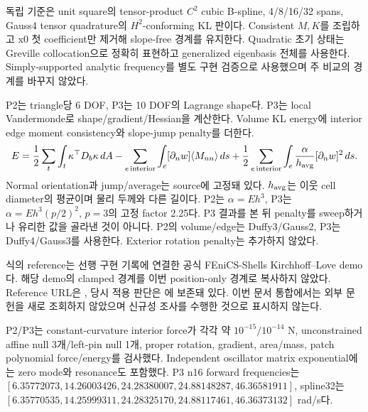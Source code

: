 \documentclass[10pt]{article}
\begin{document}
독립 기준은 unit square의 tensor-product \(C^2\) cubic B-spline, 4/8/16/32 spans,
Gauss4 tensor quadrature의 \(H^2\)-conforming KL 판이다. Consistent \(M,K\)를 조립하고
x0 첫 coefficient만 제거해 slope-free 경계를 유지한다. Quadratic 초기 상태는 Greville collocation으로
정확히 표현하고 generalized eigenbasis 전체를 사용한다.
Simply-supported analytic frequency를 별도 구현 검증으로 사용했으며 주 비교의 경계를 바꾸지 않았다.

P2는 triangle당 6 DOF, P3는 10 DOF의 Lagrange shape다. P3는 local Vandermonde로 shape/gradient/Hessian을
계산한다. Volume KL energy에 interior edge moment consistency와 slope-jump penalty를 더한다.
\begin{equation}
 E=\frac12\sum_t\int_t\kappa^\top D_b\kappa\,dA
 -\sum_{e\,\mathrm{interior}}\int_e[\partial_n w]\langle M_{nn}\rangle\,ds
 +\frac12\sum_{e\,\mathrm{interior}}\int_e\frac{\alpha}{h_{\rm avg}}[\partial_n w]^2\,ds.
 \label{eq:r1-c0ip-energy}
\end{equation}
Normal orientation과 jump/average는 source에 고정돼 있다.
\(h_{\rm avg}\)는 이웃 cell diameter의 평균이며 물리 두께와 다른 길이다.
P2는 \(\alpha=Eh^3\), P3는 \(\alpha=Eh^3(p/2)^2\), \(p=3\)의 고정 factor 2.25다.
P3 결과를 본 뒤 penalty를 sweep하거나 유리한 값을 골라낸 것이 아니다.
P2의 volume/edge는 Duffy3/Gauss2, P3는 Duffy4/Gauss3를 사용한다.
Exterior rotation penalty는 추가하지 않았다.

식의 reference는 선행 구현 기록에 연결한 공식 FEniCS-Shells Kirchhoff--Love demo다.
해당 demo의 clamped 경계를 이번 position-only 경계로 복사하지 않았다.
Reference URL은 , 당시 적용 판단은
에 보존돼 있다.
이번 문서 통합에서는 외부 문헌을 새로 조회하지 않았으며 신규성 조사를 수행한 것으로 표시하지 않는다.

P2/P3는 constant-curvature interior force가 각각 약 \(10^{-15}/10^{-14}\) N,
unconstrained affine null 3개/left-pin null 1개, proper rotation, gradient, area/mass,
patch polynomial force/energy를 검사했다.
Independent oscillator matrix exponential에는 zero mode와 resonance도 포함했다.
P3 n16 forward frequencies는
\([6.35772073,14.26003426,24.28380007,24.88148287,46.36581911]\),
spline32는 \([6.35770535,14.25999311,24.28325170,24.88117461,46.36373132]\) rad/s다.
\end{document}
